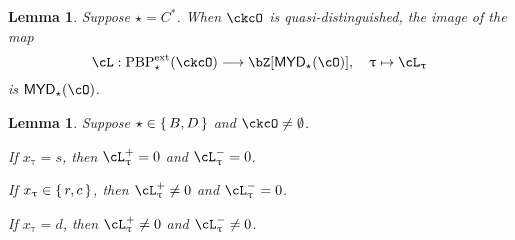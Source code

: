 \documentclass[12pt,a4paper]{amsart}
\def\MYD{{\mathsf{MYD}}}
\numberwithin{equation}{section}
\newtheorem{lem}[thm]{Lemma}
\theoremstyle{remark}
\def\PBPes{\mathrm{PBP}^{\mathrm{ext}}_{\star}}
\begin{document}
\begin{lem}\label{lem:C*}
Suppose $\star = C^{*}$.
  When $\ckcO$ is quasi-distinguished, the image of the map
    \[
 \acm: \PBPes( \ckcO )\longrightarrow \bZ[\MYD_{\star}(\cO)],
      \quad \uptau\mapsto \ac_{\uptau}
    \]
    is $\MYD_{\star}(\cO)$.
\end{lem}

\begin{lem}\label{lem:BD2}
Suppose $\star \in \set{B,D}$ and $\ckcO \neq \emptyset$.
\begin{enuma}
  \item If $x_{\uptau}=s$, then $\ac_{\uptau}^{+} =0$ and $\ac_{\uptau}^{-}=0$.
  \item If $x_{\uptau}\in \set{r,c}$, then $\ac_{\uptau}^{+} \neq 0$ and $\ac_{\uptau}^{-}=0$.
  \item If $x_{\uptau}=d$, then $\ac_{\uptau}^{+} \neq 0$ and
  $\ac_{\uptau}^{-}\neq 0$.
\end{enuma}
\end{lem}
\end{document}
